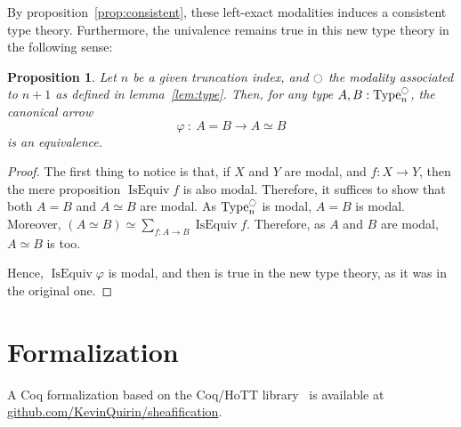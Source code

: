\documentclass[preprint,9pt,numbers]{sigplanconf}
\newtheorem{prop}[thm]{Proposition}
\newcommand \defeq {\overset{de\hspace{-0.2ex}f}{=}}
\DeclareMathOperator{\Type}{Type}
\DeclareMathOperator{\HProp}{HProp}
\DeclareMathOperator{\nat}{nat}
\DeclareMathOperator{\IsEquiv}{IsEquiv}
\newcommand{\modal}{\ensuremath{\ocircle}}
\newcommand \True {\mathrm{true}}
\newcommand \two {\mathbf{2}}
\newenvironment{mymath}[1][-0em]{%
  \newcommand\mymathaux{\vspace{#1}}%
  \vspace{#1}%
  \begin{equation*}%
  }{ %
    \mymathaux%
  \end{equation*}}
\begin{document}
By proposition~\ref{prop:consistent}, these left-exact modalities
induces a consistent type theory. Furthermore, the univalence remains
true in this new type theory in the following sense:
\begin{prop}
  Let $n$ be a given truncation index, and $\modal$ the modality
  associated to $n+1$ as defined in lemma~\ref{lem:type}. Then, for
  any type $A,B:\Type_n^\modal$, the canonical arrow
  $$\varphi~:~A = B \to A\simeq B$$
  is an equivalence.
\end{prop}
\begin{proof}
  The first thing to notice is that, if $X$ and $Y$ are modal, and
  $f:X \to Y$, then the mere proposition $\IsEquiv f$ is also modal.
  Therefore, it suffices to show that both $A=B$ and $A\simeq B$ are
  modal. As $\Type_n^\modal$ is modal, $A=B$ is modal. 
  Moreover, $(A\simeq B) \simeq \sum_{f:A\to B} \IsEquiv
  f$. Therefore, as $A$ and $B$ are modal, $A\simeq B$ is too. 

  Hence, $\IsEquiv \varphi$ is modal, and then is true in the new type
  theory, as it was in the original one.
\end{proof}






\section{Formalization} 
\label{sec:formalization}

A Coq formalization based on the Coq/HoTT library~\cite{hottlib} is available at
\url{github.com/KevinQuirin/sheafification}.
%
\end{document}
